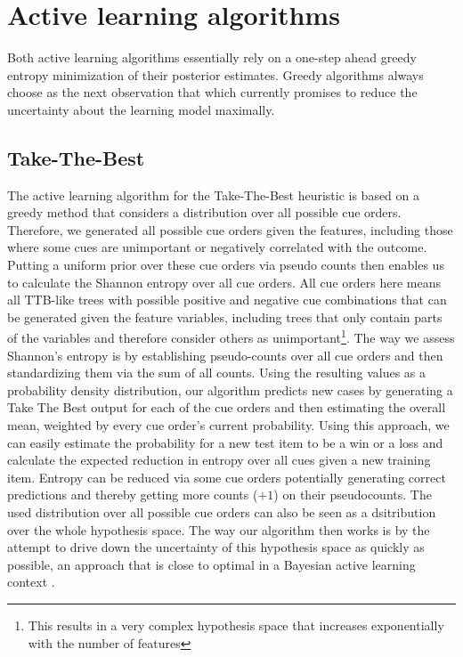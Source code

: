 \documentclass[10pt,letterpaper]{article}
\begin{document}
\section{Active learning algorithms}
Both active learning algorithms essentially rely on a one-step ahead greedy entropy minimization of their posterior estimates. Greedy algorithms always choose as the next observation that which currently promises to reduce the uncertainty about the learning model maximally. 


\subsection{Take-The-Best}
The active learning algorithm for the Take-The-Best heuristic is based on a greedy method that considers a distribution over all possible cue orders. Therefore, we generated all possible cue orders given the features, including those where some cues are unimportant or negatively correlated with the outcome. Putting a uniform prior over these cue orders via pseudo counts then enables us to calculate the Shannon entropy over all cue orders. All cue orders here means all TTB-like trees with possible positive and negative cue combinations that can be generated given the feature variables, including trees that only contain parts of the variables and therefore consider others as unimportant\footnote{This results in a very complex hypothesis space that increases exponentially with the number of features}. The way we assess Shannon's entropy is by establishing pseudo-counts over all cue orders and then standardizing them via the sum of all counts. Using the resulting values as a probability density distribution, our algorithm predicts new cases by generating a Take The Best output for each of the cue orders and then estimating the overall mean, weighted by every cue order's current probability. Using this approach, we can easily estimate the probability for a new test item to be a win or a loss and calculate the expected reduction in entropy over all cues given a new training item. Entropy can be reduced via some cue orders potentially generating correct predictions and thereby getting more counts ($+1$) on their pseudocounts. The used distribution over all possible cue orders can also be seen as a dsitribution over the whole hypothesis space. The way our algorithm then works is by the attempt to drive down the uncertainty of this hypothesis space as quickly as possible, an approach that is close to optimal in a Bayesian active learning context \citep{golovin2010near}. 
\end{document}
